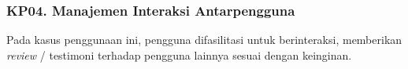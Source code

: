 \subsubsection{KP04. Manajemen Interaksi Antarpengguna}
\label{kp04}

Pada kasus penggunaan ini, pengguna difasilitasi untuk berinteraksi, memberikan \textit{review} / testimoni terhadap pengguna lainnya sesuai dengan keinginan.

	
	
	
	
	
	
	

	